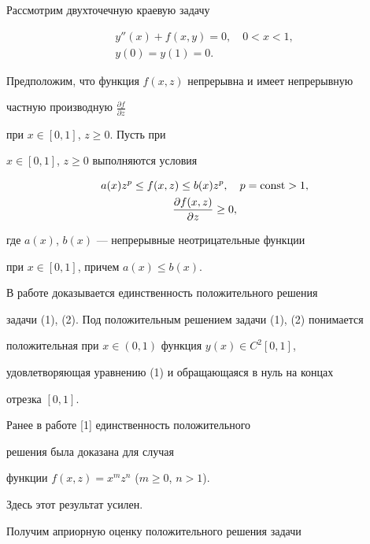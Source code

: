 Рассмотрим двухточечную краевую задачу


\begin{gather}


y''(x)+f(x,y)=0,\quad 0<x<1, \\


y(0)=y(1)=0.


\end{gather}





Предположим, что функция $f(x,z)$ непрерывна и имеет непрерывную


частную производную $\frac{\partial f}{\partial z}$


при $ x\in{[0,1]}$, $z\geq 0$. Пусть при


$x\in{[0,1]}$, $z\geq 0$ выполняются условия


\begin{gather}


a(x)z^p\leq f(x,z)\leq b(x)z^p,\quad p=\const>1,\\


\frac{\partial f(x,z)}{\partial z} \geq0,


\end{gather}


где $a(x)$, $b(x)$ --- непрерывные неотрицательные функции


при $x\in {[0,1]}$, причем $a(x)\leq b(x)$. 





В работе доказывается единственность положительного решения


задачи (1), (2). Под положительным решением задачи (1), (2) понимается


положительная при $x\in (0,1)$ функция $y(x)\in {C^2[0,1]}$, 


удовлетворяющая уравнению (1) и обращающаяся в нуль на концах 


отрезка $[0,1]$.





Ранее в работе [1] единственность положительного 


решения была доказана для случая


функции $f(x,z)=x^mz^n$ ($m\geq0$, $n>1$).


Здесь этот результат усилен.





Получим априорную оценку положительного решения задачи


